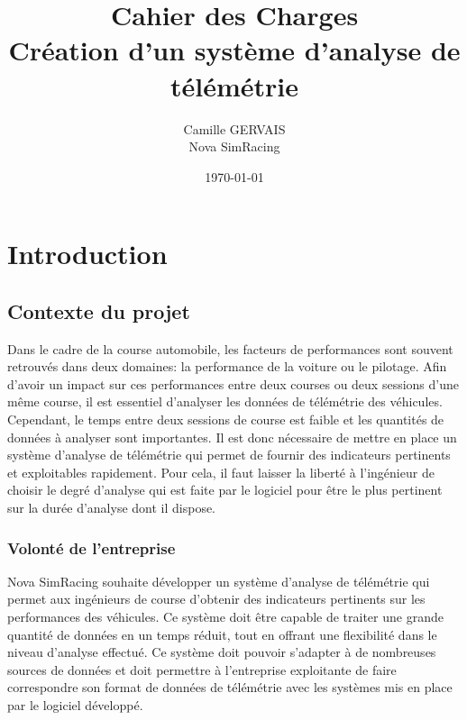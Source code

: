 \documentclass[a4paper,12pt]{report}
\title{\Huge\textbf{Cahier des Charges\\[0.5cm]
        \large Création d'un système d'analyse de télémétrie}}
\author{Camille GERVAIS\\[0.3cm]
        Nova SimRacing}
\date{\today}
\begin{document}
\maketitle
\thispagestyle{empty}

\tableofcontents
\newpage

\chapter{Introduction}

\section{Contexte du projet}

Dans le cadre de la course automobile, les facteurs de performances sont souvent retrouvés dans deux domaines: la performance de la voiture ou le pilotage. Afin d'avoir un impact sur ces performances entre deux courses ou deux sessions d'une même course, il est essentiel d'analyser les données de télémétrie des véhicules.\\

Cependant, le temps entre deux sessions de course est faible et les quantités de données à analyser sont importantes. Il est donc nécessaire de mettre en place un système d'analyse de télémétrie qui permet de fournir des indicateurs pertinents et exploitables rapidement. Pour cela, il faut laisser la liberté à l'ingénieur de choisir le degré d'analyse qui est faite par le logiciel pour être le plus pertinent sur la durée d'analyse dont il dispose.

\subsection{Volonté de l'entreprise}

Nova SimRacing souhaite développer un système d'analyse de télémétrie qui permet aux ingénieurs de course d'obtenir des indicateurs pertinents sur les performances des véhicules. Ce système doit être capable de traiter une grande quantité de données en un temps réduit, tout en offrant une flexibilité dans le niveau d'analyse effectué. Ce système doit pouvoir s'adapter à de nombreuses sources de données et doit permettre à l'entreprise exploitante de faire correspondre son format de données de télémétrie avec les systèmes mis en place par le logiciel développé.\\
\end{document}
